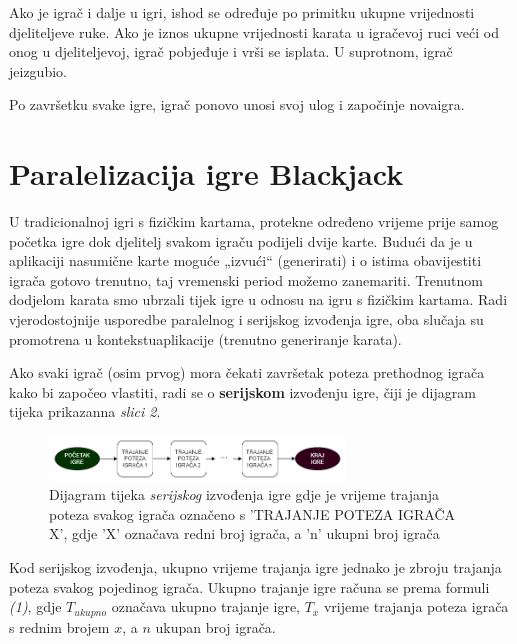 \documentclass{IEEEcsmag}
\begin{document}
Ako je igrač i dalje u igri, ishod se određuje po primitku ukupne vrijednosti djeliteljeve ruke. Ako je iznos ukupne vrijednosti karata u igračevoj ruci veći od onog u djeliteljevoj, igrač pobjeđuje i vrši se isplata. U suprotnom, igrač je\break izgubio.

Po završetku svake igre, igrač ponovo unosi svoj ulog i započinje nova\break igra. 

\newpage


\section{Paralelizacija igre Blackjack}
\vspace{5mm}
U tradicionalnoj igri s fizičkim kartama, protekne određeno vrijeme prije samog početka igre dok djelitelj svakom igraču podijeli dvije karte. Budući da je u aplikaciji nasumične karte moguće „izvući“ (generirati) i o istima obavijestiti igrača gotovo trenutno, taj vremenski period možemo zanemariti. Trenutnom dodjelom karata smo ubrzali tijek igre u odnosu na igru s fizičkim kartama. Radi vjerodostojnije usporedbe paralelnog i serijskog izvođenja igre, oba slučaja su promotrena u kontekstu\break aplikacije (trenutno generiranje karata).

Ako svaki igrač (osim prvog) mora čekati završetak poteza prethodnog igrača kako bi započeo vlastiti, radi se o \textbf{serijskom} izvođenju igre, čiji je dijagram tijeka prikazan\break na \textit{slici 2}. 

\begin{figure}[H]
\centerline{\includegraphics[width=18.5pc]{serijsko-bijelo.png}}
\caption{Dijagram tijeka \textit{serijskog} izvođenja igre gdje je vrijeme trajanja poteza svakog igrača označeno s 'TRAJANJE POTEZA IGRAČA X', gdje 'X' označava redni broj igrača, a 'n' ukupni broj igrača}
\vspace*{-5pt}
\end{figure}

Kod serijskog izvođenja, ukupno vrijeme trajanja igre jednako je zbroju trajanja poteza svakog pojedinog igrača. Ukupno trajanje igre računa se prema formuli \textit{(1)}, gdje $T_{ukupno}$ označava ukupno trajanje igre, $T_x$ vrijeme trajanja poteza igrača s rednim brojem $x$, a $n$ ukupan broj igrača.
\end{document}
